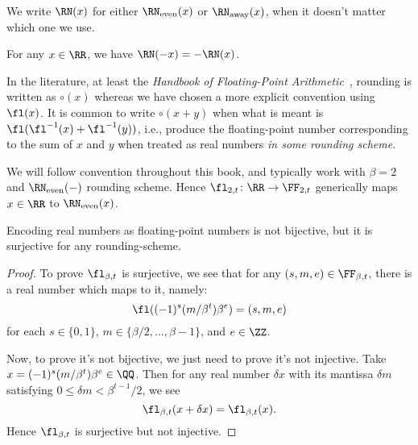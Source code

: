 \begin{notation}
  We write $\RN(x)$ for either $\RN_{\text{even}}(x)$ or $\RN_{\text{away}}(x)$,
  when it doesn't matter which one we use.
\end{notation}

\begin{thm}
  For any $x\in\RR$, we have $\RN(-x)=-\RN(x)$.
\end{thm}

\begin{notation}
In the literature, at least the \emph{Handbook of Floating-Point Arithmetic}~\cite{10.5555/3235984},
rounding is written as $\circ(x)$ whereas we have chosen a more explicit
convention using $\fl(x)$. It is common to write $\circ(x+y)$ when what
is meant is $\fl(\fl^{-1}(x)+\fl^{-1}(y))$, i.e., produce the
floating-point number corresponding to the sum of $x$ and $y$ when
treated as real numbers \emph{in some rounding scheme}.
\end{notation}

\begin{convention}
  We will follow  convention throughout this book, and
  typically work with $\beta=2$ and $\RN_{\text{even}}(-)$ rounding scheme.
  Hence $\fl_{2,t}\colon\RR\to\FF_{2,t}$ generically maps $x\in\RR$ to
  $\RN_{\text{even}}(x)$.
\end{convention}

\begin{thm}
Encoding real numbers as floating-point numbers is not bijective, but it
is surjective for any rounding-scheme.
\end{thm}
\begin{proof}
To prove $\fl_{\beta,t}$ is surjective, we see that for any $(s,m,e)\in\FF_{\beta,t}$,
there is a real number which maps to it, namely:
\begin{equation}
  \fl((-1)^{s}(m/\beta^{t})\beta^{e}) = (s,m,e)
\end{equation}
for each $s\in\{0,1\}$, $m\in\{\beta/2,\dots,\beta-1\}$, and $e\in\ZZ$.

Now, to prove it's not bijective, we just need to prove it's not
injective. Take $x = (-1)^{s}(m/\beta^{t})\beta^{e}\in\QQ$. Then for
any real number $\delta x$ with its mantissa $\delta m$ satisfying
$0\leq \delta m<\beta^{t-1}/2$, we see
\begin{equation}
  \fl_{\beta,t}(x + \delta x) = \fl_{\beta,t}(x).
\end{equation}
Hence $\fl_{\beta,t}$ is surjective but not injective.
\end{proof}

